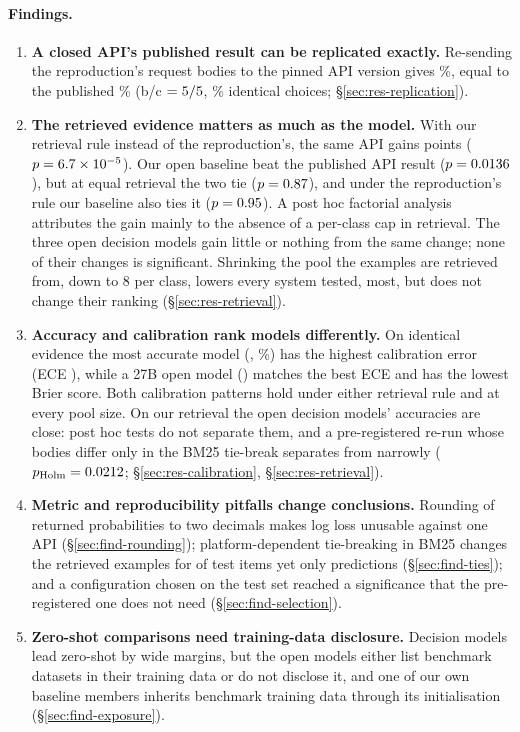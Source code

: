 \paragraph{Findings.}
\begin{enumerate}
  \item \textbf{A closed API's published result can be replicated exactly.} Re-sending the reproduction's
  \fsN{} request bodies to the pinned API version gives \fsJevAAcc\%, equal to the published \fsJevPubAcc\%
  (b/c $=5/5$, \fsJevAAgreement\% identical choices; \S\ref{sec:res-replication}).
  \item \textbf{The retrieved evidence matters as much as the model.} With our retrieval rule instead of the
  reproduction's, the same API gains \fsJevBMinusJevAPt{} points ($p=6.7\times10^{-5}$). Our open baseline beat the
  published API result ($p=0.0136$), but at equal retrieval the two tie ($p=0.87$), and under the
  reproduction's rule our baseline also ties it ($p=0.95$). A post hoc factorial analysis attributes the
  gain mainly to the absence of a per-class cap in retrieval. The three open decision models gain little or nothing
  from the same change; none of their changes is significant. Shrinking the pool the examples are retrieved from,
  down to 8 per class, lowers every system tested, \orb{} most, but does not change their ranking
  (\S\ref{sec:res-retrieval}).
  \item \textbf{Accuracy and calibration rank models differently.} On identical evidence the most accurate model
  (\flash, \fsFlashAcc\%) has the highest calibration error (ECE \fsFlashEce), while a 27B open model (\pplx)
  matches the best ECE and has the lowest Brier score. Both calibration patterns hold under either retrieval rule
  and at every pool size. On our retrieval the open decision models' accuracies are close: post hoc tests do not
  separate them, and a pre-registered re-run whose bodies differ only in the BM25 tie-break separates \flash{} from
  \pplx{} narrowly ($p_\text{Holm}=0.0212$; \S\ref{sec:res-calibration}, \S\ref{sec:res-retrieval}).
  \item \textbf{Metric and reproducibility pitfalls change conclusions.} Rounding of returned probabilities to
  two decimals makes log loss unusable against one API (\S\ref{sec:find-rounding}); platform-dependent tie-breaking
  in BM25 changes the retrieved examples for \fsStableSetDiff{} of \fsN{} test items yet only \fsStableChanged{}
  predictions (\S\ref{sec:find-ties}); and a configuration chosen on the test set reached a
  significance that the pre-registered one does not need (\S\ref{sec:find-selection}).
  \item \textbf{Zero-shot comparisons need training-data disclosure.} Decision models lead zero-shot by wide
  margins, but the open models either list benchmark datasets in their training data or do not disclose it, and
  one of our own baseline members inherits benchmark training data through its initialisation
  (\S\ref{sec:find-exposure}).
\end{enumerate}

